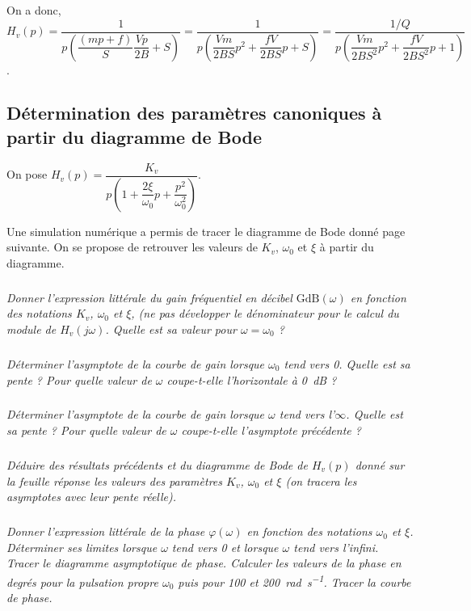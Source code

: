 \documentclass[10pt,fleqn]{article} %
\begin{document}
\begin{multicols}{2}
\begin{corrige}
On a donc, 
$H_v(p)
=\dfrac{1}{p\left(\dfrac{\left(mp+f\right)}{S} \dfrac{Vp}{2B}+S \right)}
=\dfrac{1}{p\left(\dfrac{Vm}{2BS}p^2+ \dfrac{fV}{2BS}p+S \right)}
=\dfrac{1/Q}{p\left(\dfrac{Vm}{2BS^2}p^2+ \dfrac{fV}{2BS^2}p+1 \right)}
$.
\end{corrige}

\subsection*{Détermination des paramètres canoniques à partir du diagramme de Bode}

On pose $H_v(p)=\dfrac{K_v}{p\left( 1+\dfrac{2\xi}{\omega_0} p + \dfrac{p^2}{\omega_0^2} \right)}$. 

Une simulation numérique a permis de tracer le diagramme de Bode donné page suivante. On se propose de retrouver les valeurs de $K_v$, $\omega_0$ et $\xi$ à partir du diagramme.


\subparagraph{}\textit{Donner l’expression littérale du gain fréquentiel en décibel $\text{GdB}(\omega)$ en fonction des notations $K_v$, $\omega_0$ et $\xi$, (ne pas développer le dénominateur pour le calcul du module de $H_v(j\omega)$. Quelle est sa valeur pour $\omega=\omega_0$ ?}

\subparagraph{}\textit{Déterminer l’asymptote de la courbe de gain lorsque 
$\omega_0$ tend vers 0. Quelle est sa pente ?
Pour quelle valeur de $\omega$ coupe-t-elle l’horizontale à \SI{0}{dB} ?}

\subparagraph{}\textit{Déterminer l’asymptote de la courbe de gain lorsque $\omega$ tend vers l'$\infty$. Quelle est sa pente ?	
Pour quelle valeur de $\omega$ coupe-t-elle l’asymptote précédente ?}

\subparagraph{}\textit{Déduire des résultats précédents et du diagramme de Bode de $H_v(p)$ donné sur la feuille réponse les valeurs des paramètres $K_v$, $\omega_0$ et $\xi$ (on tracera les asymptotes avec leur pente réelle).}



\subparagraph{}\textit{Donner l’expression littérale de la phase $\varphi(\omega)$ en fonction des notations $\omega_0$ et $\xi$.	
Déterminer ses limites lorsque $\omega$ tend vers 0 et lorsque $\omega$ tend vers l'infini.	
Tracer le diagramme asymptotique de phase.	
Calculer les valeurs de la phase en degrés pour la pulsation propre $\omega_0$ puis pour \num{100} et \SI{200}{rad.s^{-1}}. Tracer la courbe de phase.}



\end{multicols}
\end{document}
